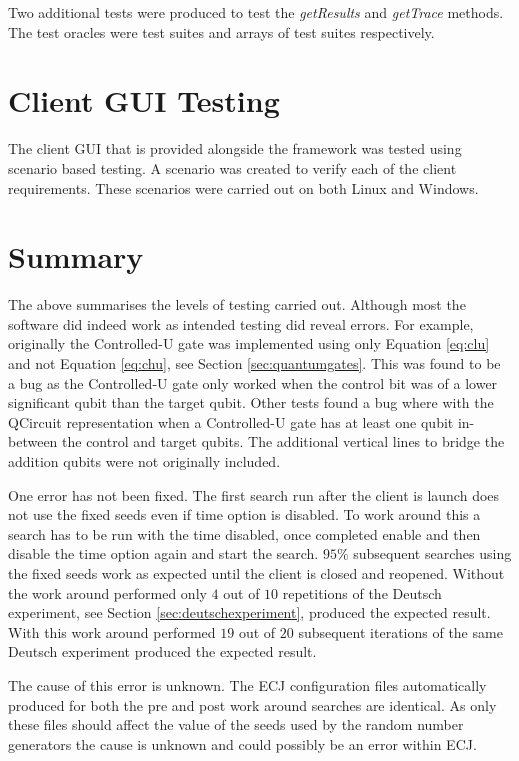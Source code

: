 Two additional tests were produced to test the \emph{getResults} and \emph{getTrace} methods.
The test oracles were test suites and arrays of test suites respectively.

\section{Client GUI Testing}
\label{sec:clientguitests}
The client GUI that is provided alongside the framework was tested using scenario based testing.
A scenario was created to verify each of the client requirements.
These scenarios were carried out on both Linux and Windows.

\section{Summary}
\label{sec:testsum}

The above summarises the levels of testing carried out.
Although most the software did indeed work as intended testing did reveal errors.
For example, originally the Controlled-U gate was implemented using only Equation \ref{eq:clu} and not Equation \ref{eq:chu}, see Section \ref{sec:quantumgates}.
This was found to be a bug as the Controlled-U gate only worked when the control bit was of a lower significant qubit than the target qubit.
Other tests found a bug where with the QCircuit representation when a Controlled-U gate has at least one qubit in-between the control and target qubits.
The additional vertical lines to bridge the addition qubits were not originally included.

One error has not been fixed.
The first search run after the client is launch does not use the fixed seeds even if time option is disabled.
To work around this a search has to be run with the time disabled, once completed enable and then disable the time option again and start the search.
$95\%$ subsequent searches using the fixed seeds work as expected until the client is closed and reopened.
Without the work around performed only $4$ out of $10$ repetitions of the Deutsch experiment, see Section \ref{sec:deutschexperiment}, produced the expected result.
With this work around performed $19$ out of $20$ subsequent iterations of the same Deutsch experiment produced the expected result.

The cause of this error is unknown.
The ECJ configuration files automatically produced for both the pre and post work around searches are identical.
As only these files should affect the value of the seeds used by the random number generators the cause is unknown and could possibly be an error within ECJ\cite{ecjtool}.

